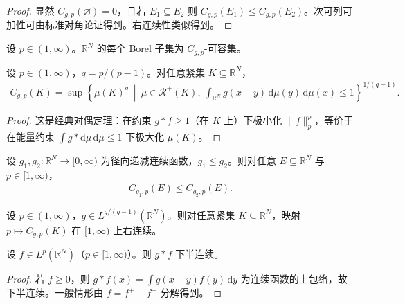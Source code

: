 \documentclass[../../main.tex]{subfiles}%
\begin{document}
\begin{proof}
显然 $C_{g,p}(\varnothing )=0$，且若 $E_1\subseteq E_2$ 则 $C_{g,p}(E_1)\leqslant C_{g,p}(E_2)$。次可列可加性可由标准对角论证得到。右连续性类似得到。
\end{proof}

\begin{proposition}\label{proposition:ch03-Borel可容}
设 $p\in(1,\infty)$。$\mathbb{R}^N$ 的每个 Borel 子集为 $C_{g,p}$-可容集。
\end{proposition}

\begin{proposition}\label{proposition:ch03-对偶}
设 $p\in(1,\infty)$，$q=p/(p-1)$。对任意紧集 $K\subseteq\mathbb{R}^N$，
\begin{align}
C_{g,p}(K)=\sup\left\{\mu(K)^q\ \middle|\ \mu\in\mathscr{R}^+(K),\ \int_{\mathbb{R}^N}g(x-y)\,\mathrm{d}\mu(y)\,\mathrm{d}\mu(x)\leqslant1\right\}^{1/(q-1)}.\label{align:ch03-3.25}
\end{align}
\end{proposition}

\begin{proof}
这是经典对偶定理：在约束 $g*f\geqslant1$（在 $K$ 上）下极小化 $\|f\|_p^p$，等价于在能量约束 $\int g*\mathrm{d}\mu\,\mathrm{d}\mu\leqslant1$ 下极大化 $\mu(K)$。
\end{proof}

\begin{proposition}\label{proposition:ch03-比较}
设 $g_1,g_2:\mathbb{R}^N\to[0,\infty)$ 为径向递减连续函数，$g_1\leqslant g_2$。则对任意 $E\subseteq\mathbb{R}^N$ 与 $p\in[1,\infty)$，
\begin{align*}
C_{g_1,p}(E)\leqslant C_{g_2,p}(E).
\end{align*}
\end{proposition}

\begin{proposition}\label{proposition:ch03-简单函数逼近}
设 $p\in(1,\infty)$，$g\in L^{q/(q-1)}(\mathbb{R}^N)$。则对任意紧集 $K\subseteq\mathbb{R}^N$，映射 $p\mapsto C_{g,p}(K)$ 在 $[1,\infty)$ 上右连续。
\end{proposition}

\begin{lemma}\label{lemma:ch03-位势下半连续}
设 $f\in L^p(\mathbb{R}^N)$（$p\in[1,\infty)$）。则 $g*f$ 下半连续。
\end{lemma}

\begin{proof}
若 $f\geqslant0$，则 $g*f(x)=\int g(x-y)f(y)\,\mathrm{d}y$ 为连续函数的上包络，故下半连续。一般情形由 $f=f^+-f^-$ 分解得到。
\end{proof}
\end{document}
